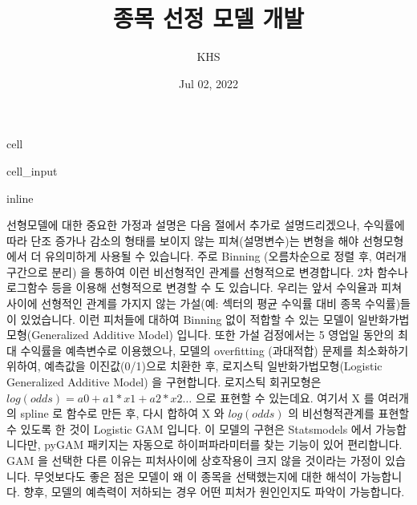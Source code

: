 \documentclass[letterpaper,10pt,english]{jupyterBook}
\title{종목 선정 모델 개발}
\date{Jul 02, 2022}
\author{KHS}
\begin{document}
\pagestyle{empty}
\sphinxmaketitle
\pagestyle{plain}
\sphinxtableofcontents
\pagestyle{normal}
\label{\detokenize{chapter5/5.2.3_GAM::doc}}
\begin{sphinxuseclass}{cell}\begin{sphinxVerbatimInput}

\begin{sphinxuseclass}{cell_input}
\begin{sphinxVerbatim}[commandchars=\\\{\}]
   
 inline
   
   
   
 
 
  
\end{sphinxVerbatim}

\end{sphinxuseclass}\end{sphinxVerbatimInput}

\end{sphinxuseclass}


\sphinxAtStartPar
선형모델에 대한 중요한 가정과 설명은 다음 절에서 추가로 설명드리겠으나,  수익률에 따라 단조 증가나 감소의 형태를 보이지 않는 피쳐(설명변수)는 변형을 해야 선형모형에서 더 유의미하게 사용될 수 있습니다.  주로 Binning (오름차순으로 정렬 후, 여러개 구간으로 분리) 을 통하여 이런 비선형적인 관계를 선형적으로 변경합니다. 2차 함수나 로그함수 등을 이용해 선형적으로 변경할 수 도 있습니다. 우리는 앞서 수익율과 피쳐사이에 선형적인 관계를 가지지 않는 가설(예: 섹터의 평균 수익률 대비 종목 수익률)들 이 있었습니다. 이런 피처들에 대하여 Binning 없이 적합할 수 있는 모델이 일반화가법모형(Generalized Additive Model) 입니다. 또한 가설 검정에서는 5 영업일 동안의 최대 수익률을 예측변수로 이용했으나, 모델의 overfitting (과대적합) 문제를 최소화하기 위하여, 예측값을 이진값(0/1)으로 치환한 후, 로지스틱 일반화가법모형(Logistic Generalized Additive Model) 을 구현합니다. 로지스틱 회귀모형은 \(log(odds) = a0 + a1*x1 + a2*x2 …\)  으로 표현할 수 있는데요. 여기서 X 를 여러개의 spline 로 함수로 만든 후, 다시 합하여 X 와 \(log(odds)\) 의  비선형적관계를 표현할 수 있도록 한 것이  Logistic GAM 입니다.  이 모델의 구현은 Statsmodels 에서 가능합니다만, pyGAM 패키지는 자동으로 하이퍼파라미터를 찾는 기능이 있어 편리합니다. GAM 을 선택한 다른 이유는 피처사이에 상호작용이 크지 않을 것이라는 가정이 있습니다. 무엇보다도 좋은 점은 모델이 왜 이 종목을 선택했는지에 대한 해석이 가능합니다. 향후, 모델의 예측력이 저하되는 경우 어떤 피처가 원인인지도 파악이 가능합니다.
\end{document}
